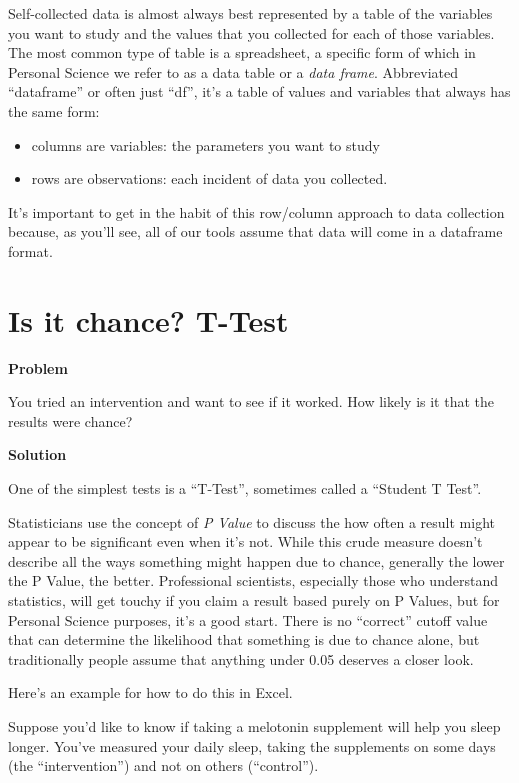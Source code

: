 \documentclass[
]{book}
\providecommand{\tightlist}{%
  \setlength{\itemsep}{0pt}\setlength{\parskip}{0pt}}
\begin{document}
Self-collected data is almost always best represented by a table of the variables you want to study and the values that you collected for each of those variables. The most common type of table is a spreadsheet, a specific form of which in Personal Science we refer to as a data table or a \emph{data frame}. Abbreviated ``dataframe'' or often just ``df'', it's a table of values and variables that always has the same form:

\begin{itemize}
\tightlist
\item
  columns are variables: the parameters you want to study
\item
  rows are observations: each incident of data you collected.
\end{itemize}

It's important to get in the habit of this row/column approach to data collection because, as you'll see, all of our tools assume that data will come in a dataframe format.

\hypertarget{is-it-chance-t-test}{%
\section{Is it chance? T-Test}\label{is-it-chance-t-test}}

\textbf{Problem}

You tried an intervention and want to see if it worked. How likely is it that the results were chance?

\textbf{Solution}

One of the simplest tests is a ``T-Test'', sometimes called a ``Student T Test''.

Statisticians use the concept of \emph{P Value} to discuss the how often a result might appear to be significant even when it's not. While this crude measure doesn't describe all the ways something might happen due to chance, generally the lower the P Value, the better. Professional scientists, especially those who understand statistics, will get touchy if you claim a result based purely on P Values, but for Personal Science purposes, it's a good start. There is no ``correct'' cutoff value that can determine the likelihood that something is due to chance alone, but traditionally people assume that anything under 0.05 deserves a closer look.

Here's an example for how to do this in Excel.

Suppose you'd like to know if taking a melotonin supplement will help you sleep longer. You've measured your daily sleep, taking the supplements on some days (the ``intervention'') and not on others (``control'').
\end{document}
